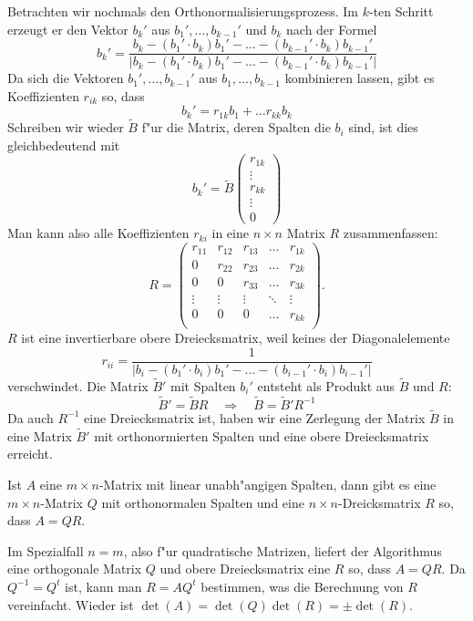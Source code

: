 Betrachten wir nochmals den Orthonormalisierungsprozess.
Im $k$-ten Schritt erzeugt er den Vektor $b_k'$ aus $b_1',\dots,b_{k-1}'$
und $b_k$ nach der Formel
\[
b_k'=\frac{
b_k-(b_1'\cdot b_k)b_1'-\dots-(b_{k-1}'\cdot b_k)b_{k-1}'
}{|
b_k-(b_1'\cdot b_k)b_1'-\dots-(b_{k-1}'\cdot b_k)b_{k-1}'
|}
\]
Da sich die Vektoren $b_1',\dots,b_{k-1}'$ aus 
$b_1,\dots,b_{k-1}$ kombinieren lassen, gibt es Koeffizienten $r_{ik}$
so, dass
\[
b_k'=r_{1k}b_1+\dots r_{kk}b_k
\]
Schreiben wir wieder $\tilde B$ f"ur die Matrix, deren Spalten die
$b_i$ sind, ist dies gleichbedeutend mit
\[
b_k'=\tilde B\begin{pmatrix}r_{1k}\\\vdots\\r_{kk}\\\vdots\\0\end{pmatrix}
\]
Man kann also alle Koeffizienten $r_{ki}$ in eine $n\times n$ Matrix $R$
zusammenfassen:
\[
R=\begin{pmatrix}
r_{11}&r_{12}&r_{13}&\dots &r_{1k}\\
0     &r_{22}&r_{23}&\dots &r_{2k}\\
0     &0     &r_{33}&\dots &r_{3k}\\
\vdots&\vdots&\vdots&\ddots&\vdots\\
0     &0     &0     &\dots &r_{kk}\\
\end{pmatrix}.
\]
$R$ ist eine invertierbare
obere Dreiecksmatrix, weil keines der
Diagonalelemente
\[
r_{ii}=\frac1{|
b_i-(b_1'\cdot b_i)b_1'-\dots-(b_{i-1}'\cdot b_i)b_{i-1}'
|}
\]
verschwindet.
Die Matrix $\tilde B'$ mit Spalten $b_i'$ entsteht als Produkt aus $\tilde B$
und $R$:
\[
\tilde B'=\tilde BR
\quad\Rightarrow\quad
\tilde B=\tilde B'R^{-1}
\]
Da auch $R^{-1}$ eine Dreiecksmatrix ist, haben wir eine Zerlegung der
Matrix $\tilde B$ in eine Matrix $\tilde B'$ mit orthonormierten
Spalten und eine obere Dreiecksmatrix erreicht.

\begin{satz}[QR-Zerlegung]
Ist $A$ eine $m\times n$-Matrix mit linear unabh"angigen Spalten,
dann gibt es eine $m\times n$-Matrix $Q$ mit orthonormalen Spalten
und eine $n\times n$-Dreicksmatrix $R$ so, dass $A=QR$.
\end{satz}

Im Spezialfall $n=m$, also f"ur quadratische Matrizen, liefert der
Algorithmus eine orthogonale Matrix $Q$ und obere Dreiecksmatrix eine $R$
so, dass $A=QR$.
Da $Q^{-1}=Q^t$ ist, kann man $R=AQ^t$ bestimmen,
was die Berechnung von $R$ vereinfacht.
Wieder ist $\det(A)=\det(Q)\det(R)=\pm\det(R)$.


